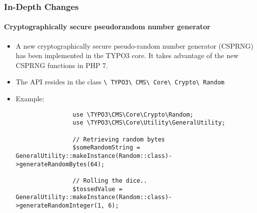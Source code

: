 \begin{frame}[fragile]
	\frametitle{In-Depth Changes}
	\framesubtitle{Cryptographically secure pseudorandom number generator}

	\lstset{basicstyle=\tiny\ttfamily}

	\begin{itemize}

		\item A new cryptographically secure pseudo-random number generator (CSPRNG) has been
			implemented in the TYPO3 core.\newline
			It takes advantage of the new CSPRNG functions in PHP 7.

		\item The API resides in the class
			\texttt{\textbackslash
				TYPO3\textbackslash
				CMS\textbackslash
				Core\textbackslash
				Crypto\textbackslash
				Random}

		\item Example:

			\begin{lstlisting}
				use \TYPO3\CMS\Core\Crypto\Random;
				use \TYPO3\CMS\Core\Utility\GeneralUtility;

				// Retrieving random bytes
				$someRandomString = GeneralUtility::makeInstance(Random::class)->generateRandomBytes(64);

				// Rolling the dice..
				$tossedValue = GeneralUtility::makeInstance(Random::class)->generateRandomInteger(1, 6);
			\end{lstlisting}

	\end{itemize}

\end{frame}

